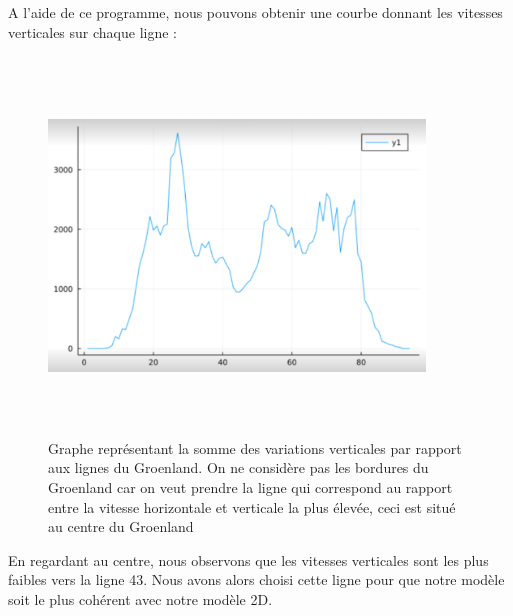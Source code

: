 \documentclass{article}
\begin{document}
\newpage

\vspace*{\fill}
A l'aide de ce programme, nous pouvons obtenir une courbe donnant les vitesses verticales sur chaque ligne :
\begin{figure}[!htpb]
\centering
\includegraphics[width=10cm, keepaspectratio=true, height=10cm]{Vitesses.png}
\caption{Graphe représentant la somme des variations verticales par rapport aux lignes du Groenland. On ne considère pas les bordures du Groenland car on veut prendre la ligne qui correspond au rapport entre la vitesse horizontale et verticale la plus élevée, ceci est situé au centre du Groenland }
\end{figure}
\newline
 En regardant au centre, nous observons que les vitesses verticales sont les plus faibles vers la ligne 43. Nous avons alors choisi cette ligne pour que notre modèle soit le plus cohérent avec notre modèle 2D. 
\vspace*{\fill}

\newpage
\end{document}
